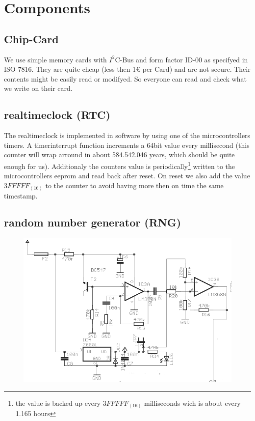 \section{Components}

\subsection{Chip-Card}
We use simple memory cards with $I^2$C-Bus and form factor ID-00 as specifyed in ISO 7816. They are quite cheap (less then 1\euro{} per Card) and are not secure. Their contents might be easily read or modifyed. So everyone can read and check what we write on their card.


\subsection{realtimeclock (RTC)}
The realtimeclock is implemented in software by using one of the microcontrollers timers. A timerinterrupt function increments a 64bit value every millisecond (this counter will wrap arround in about 584.542.046 years, which should be quite enough for us). Additionaly the counters value is periodically\footnote{the value is backed up every $3FFFFF_{(16)}$ milliseconds wich is about every 1.165 hours} written to the microcontrollers eeprom and read back after reset. On reset we also add the value $3FFFFF_{(16)}$ to the counter to avoid having more then on time the same timestamp.

\subsection{random number generator (RNG)}
\begin{figure}
 \includegraphics[scale=0.5]{RNG} 
\end{figure}


